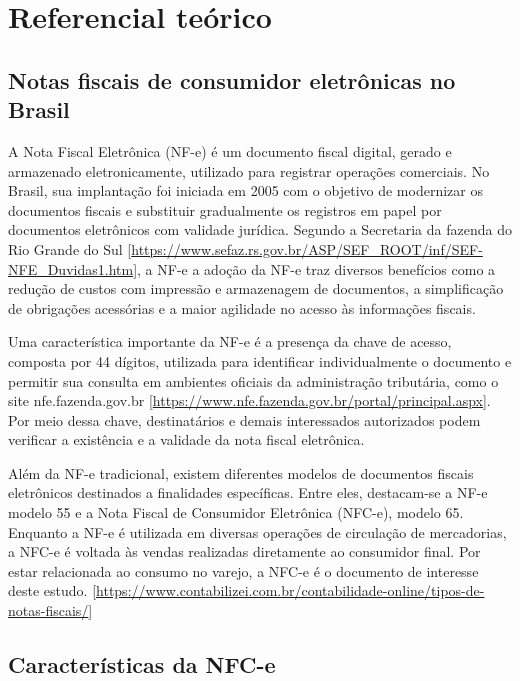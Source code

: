 \documentclass[twoside,english,brazilian]{UNISINOSmonografia}
\begin{document}
\chapter{Referencial teórico}

\section{Notas fiscais de consumidor eletrônicas no Brasil}

A Nota Fiscal Eletrônica (NF-e) é um documento fiscal digital, gerado e armazenado eletronicamente, utilizado para registrar operações comerciais. No Brasil, sua implantação foi iniciada em 2005 com o objetivo de modernizar os documentos fiscais e substituir gradualmente os registros em papel por documentos eletrônicos com validade jurídica. Segundo a Secretaria da fazenda do Rio Grande do Sul [\url{https://www.sefaz.rs.gov.br/ASP/SEF_ROOT/inf/SEF-NFE_Duvidas1.htm}], a NF-e a adoção da NF-e traz diversos benefícios como a redução de custos com impressão e armazenagem de documentos, a simplificação de obrigações acessórias e a maior agilidade no acesso às informações fiscais.

Uma característica importante da NF-e é a presença da chave de acesso, composta por 44 dígitos, utilizada para identificar individualmente o documento e permitir sua consulta em ambientes oficiais da administração tributária, como o site nfe.fazenda.gov.br [\url{https://www.nfe.fazenda.gov.br/portal/principal.aspx}]. Por meio dessa chave, destinatários e demais interessados autorizados podem verificar a existência e a validade da nota fiscal eletrônica.

Além da NF-e tradicional, existem diferentes modelos de documentos fiscais eletrônicos destinados a finalidades específicas. Entre eles, destacam-se a NF-e modelo 55 e a Nota Fiscal de Consumidor Eletrônica (NFC-e), modelo 65. Enquanto a NF-e é utilizada em diversas operações de circulação de mercadorias, a NFC-e é voltada às vendas realizadas diretamente ao consumidor final. Por estar relacionada ao consumo no varejo, a NFC-e é o documento de interesse deste estudo. [\url{https://www.contabilizei.com.br/contabilidade-online/tipos-de-notas-fiscais/}]




\section{Características da NFC-e}
\end{document}
